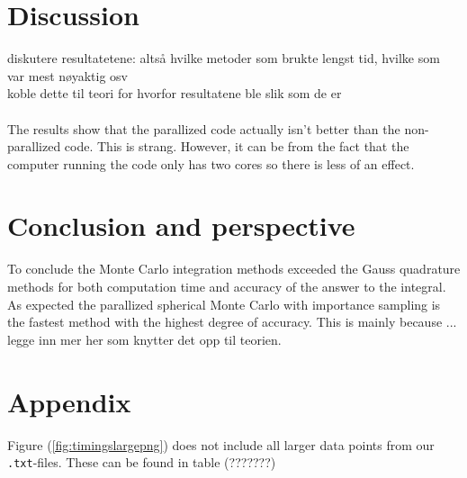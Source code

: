 \documentclass{article}
\begin{document}
\vspace{1cm}

\section{Discussion} \label{sec:Discussion}

diskutere resultatetene: altså hvilke metoder som brukte lengst tid, hvilke som var mest nøyaktig osv \\
koble dette til teori for hvorfor resultatene ble slik som de er \\
\\
The results show that the parallized code actually isn't better than the non-parallized code. This is strang. However, it can be from the fact that the computer running the code only has two cores so there is less of an effect.

\vspace{1cm}

\section{Conclusion and perspective} \label{sec:Conclusion}

To conclude the Monte Carlo integration methods exceeded the Gauss quadrature methods for both computation time and accuracy of the answer to the integral. As expected the parallized spherical Monte Carlo with importance sampling is the fastest method with the highest degree of accuracy. This is mainly because ... \\

legge inn mer her som knytter det opp til teorien.


\vspace{1cm}

\section{Appendix} \label{sec:Appendix}

Figure (\ref{fig:timingslargepng}) does not include all larger data points from our \texttt{.txt}-files. These can be found in table (???????)
\end{document}

